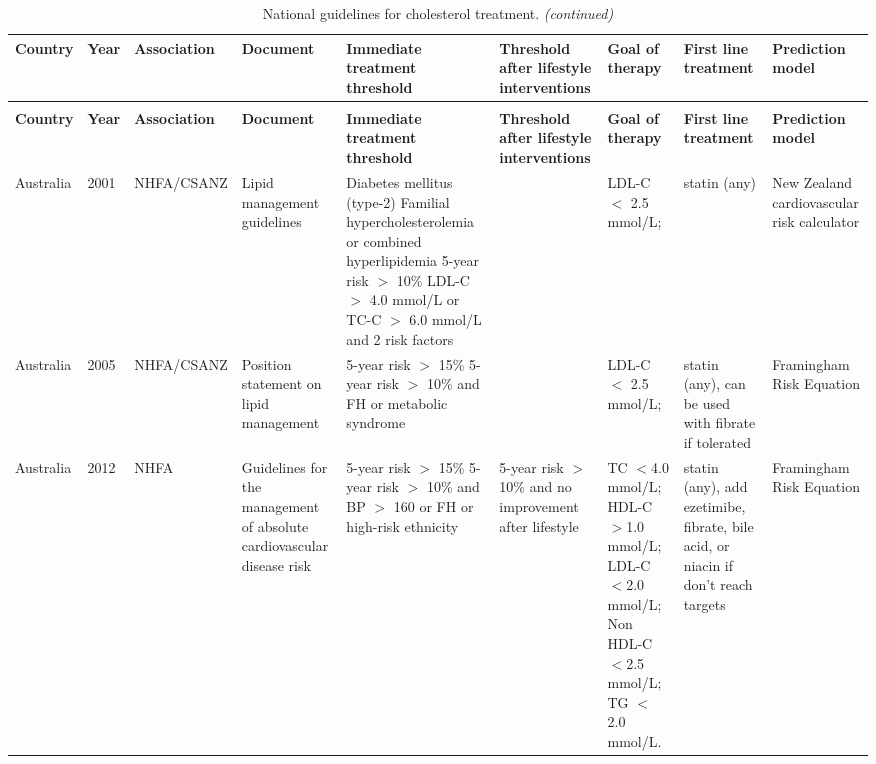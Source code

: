 \documentclass[12pt]{article}
\begin{document}
\begin{appendix}
\begin{refsection}
\begin{landscape}
\tiny{
\begin{longtable}{
    >{\raggedright}p{}
    ll
    >{\raggedright}p{}
    >{\raggedright}p{}
    >{\raggedright}p{}
    >{\raggedright}p{}
    >{\raggedright}p{}
    p{}}
    \caption{\label{tab:guidelines}National guidelines for cholesterol treatment.}\\
    \toprule
    \textbf{Country} &\textbf{Year} &\textbf{Association} &\textbf{Document} &\textbf{Immediate treatment threshold} &\textbf{Threshold after lifestyle interventions} &\textbf{Goal of therapy} &\textbf{First line treatment} &\textbf{Prediction model} \\
    \midrule
    \endfirsthead
    \caption[]{National guidelines for cholesterol treatment. \textit{(continued)}}\\
    \toprule
    \textbf{Country} &\textbf{Year} &\textbf{Association} &\textbf{Document} &\textbf{Immediate treatment threshold} &\textbf{Threshold after lifestyle interventions} &\textbf{Goal of therapy} &\textbf{First line treatment} &\textbf{Prediction model} \\
    \midrule
    \endhead 
    Australia &2001 &NHFA/CSANZ &Lipid management guidelines &Diabetes mellitus (type-2) Familial hypercholesterolemia or combined hyperlipidemia 5-year risk $>$ 10\% LDL-C $>$ 4.0 mmol/L or TC-C $>$ 6.0 mmol/L and 2 risk factors & &LDL-C $<$ 2.5 mmol/L; &statin (any) &New Zealand cardiovascular risk calculator \\
    Australia &2005 &NHFA/CSANZ &Position statement on lipid management &5-year risk $>$ 15\% 5-year risk $>$ 10\% and FH or metabolic syndrome & &LDL-C $<$ 2.5 mmol/L; &statin (any), can be used with fibrate if tolerated &Framingham Risk Equation \\
    Australia &2012 &NHFA &Guidelines for the management of absolute cardiovascular disease risk &5-year risk $>$ 15\% 5-year risk $>$ 10\% and BP $>$ 160 or FH or high-risk ethnicity &5-year risk $>$ 10\% and no improvement after lifestyle &TC $<$4.0 mmol/L; HDL-C $>$1.0 mmol/L; LDL-C $<$2.0 mmol/L;  Non HDL-C $<$2.5 mmol/L; TG $<$2.0 mmol/L. &statin (any), add ezetimibe, fibrate, bile acid, or niacin if don't reach targets &Framingham Risk Equation \\

\end{longtable}}
\end{landscape}
\end{refsection}
\end{appendix}
\end{document}
